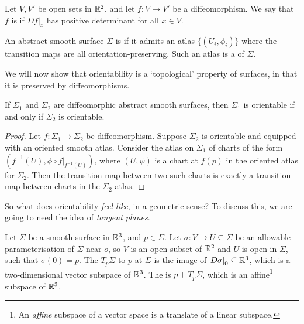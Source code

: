 \documentclass[a4paper]{scrartcl}
\begin{document}
\begin{definition}
    Let $V, V'$ be open sets in $\mathbb{R}^2$, and let $f: V \rightarrow V'$ be a diffeomorphism. We say that $f$ is  if $\left. Df\right|_x$ has positive determinant for all $x \in V$.
\end{definition}

\begin{definition}[Orientability]
An abstract smooth surface $\Sigma$ is  if it admits an atlas $\{(U_i, \phi_i)\}$ where the transition maps are all orientation-preserving. Such an atlas is a  of $\Sigma$.
\end{definition}

We will now show that orientability is a `topological' property of surfaces, in that it is preserved by diffeomorphisms.

\begin{theorem}
    If $\Sigma_1$ and $\Sigma_2$ are diffeomorphic abstract smooth surfaces, then $\Sigma_1$ is orientable if and only if $\Sigma_2$ is orientable.
\end{theorem}
\begin{proof}
    Let $f: \Sigma_1 \rightarrow \Sigma_2$ be diffeomorphism. Suppose $\Sigma_2$ is orientable and equipped with an oriented smooth atlas. Consider the atlas on $\Sigma_1$ of charts of the form $(f^{-1}(U), \phi \circ \left.f\right|_{f^{-1}(U)})$, where $(U, \psi)$ is a chart at $f(p)$ in the oriented atlas for $\Sigma_2$. Then the transition map between two such charts is exactly a transition map between charts in the $\Sigma_2$ atlas. 
\end{proof}

So what does orientability \emph{feel like}, in a geometric sense? To discuss this, we are going to need the idea of \emph{tangent planes}.

\begin{definition}
Let $\Sigma$ be a smooth surface in $\mathbb{R}^3$, and $p \in \Sigma$. Let $\sigma: V \rightarrow U \subseteq \Sigma$ be an allowable parameterisation of $\Sigma$ near $o$, so $V$ is an open subset of $\mathbb{R}^2$ and $U$ is open in $\Sigma$, such that $\sigma(0) = p$. The  $T_p \Sigma$ to $p$ at $\Sigma$ is the image of $\left.D\sigma \right|_0 \subseteq \mathbb{R}^3$, which is a two-dimensional vector subspace of $\mathbb{R}^3$. The  is $p + T_p \Sigma$, which is an affine\footnote{An \emph{affine} subspace of a vector space is a translate of a linear subspace.} subspace of $\mathbb{R}^3$.
\end{definition}
\end{document}

